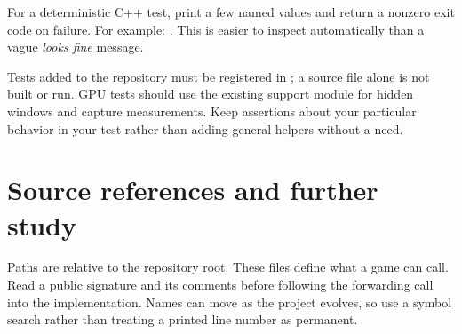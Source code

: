 \documentclass[11pt,a4paper]{article}
\begin{document}
For a deterministic C++ test, print a few named values and return a nonzero exit code on failure. For example: . This is easier to inspect automatically than a vague \emph{looks fine} message.

Tests added to the repository must be registered in ; a source file alone is not built or run. GPU tests should use the existing support module for hidden windows and capture measurements. Keep assertions about your particular behavior in your test rather than adding general helpers without a need.

\clearpage
\part{Source references and further study}

Paths are relative to the repository root. These files define what a game can call. Read a public signature and its comments before following the forwarding call into the implementation. Names can move as the project evolves, so use a symbol search rather than treating a printed line number as permanent.
\end{document}
